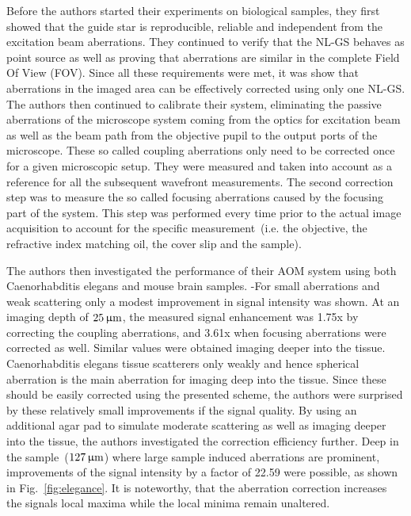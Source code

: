 Before the authors started their experiments on biological samples, they first showed that the guide star is reproducible, reliable and independent from the excitation beam aberrations. They continued to verify that the NL-GS behaves as point source as well as proving that aberrations are similar in the complete Field Of View (FOV). Since all these requirements were met, it was show that aberrations in the imaged area can be effectively corrected using only one NL-GS. The authors then continued to calibrate their system, eliminating the passive aberrations of the microscope system coming from the optics for excitation beam as well as the beam path from the objective pupil to the output ports of the microscope. These so called coupling aberrations only need to be corrected once for a given microscopic setup. They were measured and taken into account as a reference for all the subsequent wavefront measurements. The second correction step was to measure the so called focusing aberrations caused by the focusing part of the system. This step was performed every time prior to the actual image acquisition to account for the specific measurement~(i.e. the objective, the refractive index matching oil, the cover slip and the sample).\newline

The authors then investigated the performance of their AOM system using both Caenorhabditis elegans and mouse brain samples. -For small aberrations and weak scattering only a modest improvement in signal intensity was shown. At an imaging depth of $\unit[25]{\upmu m}$, the  measured signal enhancement was 1.75x by correcting the coupling aberrations, and 3.61x when focusing aberrations were corrected as well. Similar values were obtained imaging deeper into the tissue. 
Caenorhabditis elegans tissue scatterers only weakly and hence spherical aberration is the main aberration for imaging deep into the tissue. Since these should be easily corrected using the presented scheme, the authors were surprised by these relatively small improvements if the signal quality. By using an additional agar pad to simulate moderate scattering as well as imaging deeper into the tissue, the authors investigated the correction efficiency further. Deep in the sample~($\unit[127]{\upmu m}$) where large sample induced aberrations are prominent, improvements of the signal intensity by a factor of 22.59 were possible, as shown in Fig.~\ref{fig:elegance}. It is noteworthy, that the aberration correction increases the signals local maxima while the local minima remain unaltered. 


